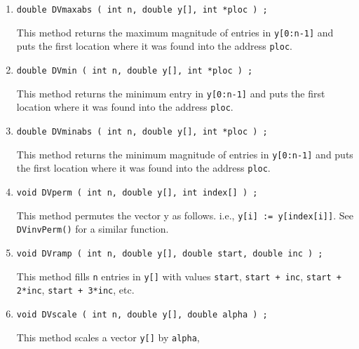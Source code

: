 \begin{enumerate}
{\tt ploc}.
\item
\begin{verbatim}
double DVmaxabs ( int n, double y[], int *ploc ) ;
\end{verbatim}
This method returns the maximum magnitude of entries in 
{\tt y[0:n-1]} and puts the first location where 
it was found into the address {\tt ploc}.
\item
\begin{verbatim}
double DVmin ( int n, double y[], int *ploc ) ;
\end{verbatim}
This method returns the minimum entry in {\tt y[0:n-1]}
and puts the first location where it was found into the address
{\tt ploc}.
\item
\begin{verbatim}
double DVminabs ( int n, double y[], int *ploc ) ;
\end{verbatim}
This method returns the minimum magnitude of entries in 
{\tt y[0:n-1]} and puts the first location where 
it was found into the address {\tt ploc}.
\item
\begin{verbatim}
void DVperm ( int n, double y[], int index[] ) ;
\end{verbatim}
This method permutes the vector y as follows.
i.e.,
{\tt y[i] := y[index[i]]}.
See {\tt DVinvPerm()} for a similar function.
\item
\begin{verbatim}
void DVramp ( int n, double y[], double start, double inc ) ;
\end{verbatim}
This method fills {\tt n} entries in {\tt y[]} with 
values 
{\tt start},
{\tt start + inc},
{\tt start + 2*inc},
{\tt start + 3*inc}, etc.
\item
\begin{verbatim}
void DVscale ( int n, double y[], double alpha ) ;
\end{verbatim}
This method scales a vector {\tt y[]} by {\tt alpha},

\end{enumerate}
